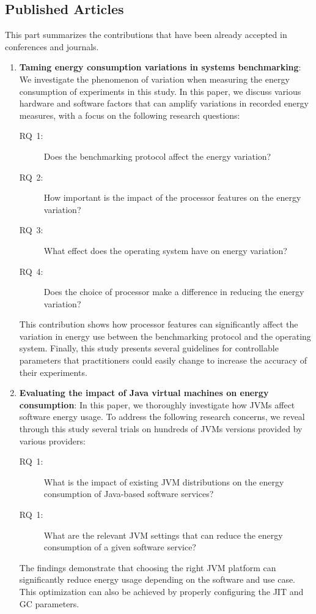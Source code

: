 \subsection{Published Articles}
This part summarizes the contributions that have been already accepted in conferences and journals.

\begin{enumerate}
      \item \textbf{Taming energy consumption variations in systems benchmarking}:
      We investigate the phenomenon of variation when measuring the energy consumption of experiments in this study.
      In this paper, we discuss various hardware and software factors that can amplify variations in recorded energy measures, with a focus on the following research questions:
      \begin{description}
            \item[\textsc{RQ}~1:] Does the benchmarking protocol affect the energy variation?
            \item[\textsc{RQ}~2:] How important is the impact of the processor features on the energy variation?
            \item[\textsc{RQ}~3:] What effect does the operating system have on energy variation?
            \item[\textsc{RQ}~4:] Does the choice of processor make a difference in reducing the energy variation?
      \end{description}

      This contribution shows how processor features can significantly affect the variation in energy use between the benchmarking protocol and the operating system.
      Finally, this study presents several guidelines for controllable parameters that practitioners could easily change to increase the accuracy of their experiments.



      \item \textbf{Evaluating the impact of Java virtual machines on energy consumption}:
      In this paper, we thoroughly investigate how JVMs affect software energy usage.
      To address the following research concerns, we reveal through this study several trials on hundreds of JVMs versions provided by various providers:
      \begin{description}
            \item[\textsc{RQ}~1:] What is the impact of existing JVM distributions on the energy consumption of Java-based software services?
            \item [\textsc{RQ}~1:] What are the relevant JVM settings that can reduce the energy consumption of a given software service?
      \end{description}
      The findings demonstrate that choosing the right JVM platform can significantly reduce energy usage depending on the software and use case.
      This optimization can also be achieved by properly configuring the JIT and GC parameters.

\end{enumerate}

